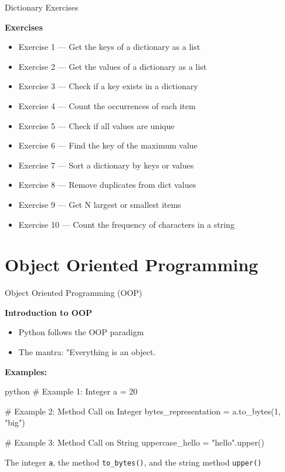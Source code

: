 \documentclass[
	11pt, 
]{beamer}
\begin{document}

\begin{frame}[fragile]{Dictionary Exercises}

\begin{alertblock}{\textbf{Exercises}}
\begin{itemize}
    \item Exercise 1 --- Get the keys of a dictionary as a list
    \item Exercise 2 --- Get the values of a dictionary as a list
    \item Exercise 3 --- Check if a key exists in a dictionary
    \item Exercise 4 --- Count the occurrences of each item
    \item Exercise 5 --- Check if all values are unique
    \item Exercise 6 --- Find the key of the maximum value
    \item Exercise 7 --- Sort a dictionary by keys or values
    \item Exercise 8 --- Remove duplicates from dict values
    \item Exercise 9 --- Get N largest or smallest items
    \item Exercise 10 --- Count the frequency of characters in a string 
\end{itemize}
\end{alertblock}
\end{frame}


\section{Object Oriented Programming}
\begin{frame}[fragile]{Object Oriented Programming (OOP)}

\begin{block}{\textbf{Introduction to OOP}}
    \begin{itemize}
        \item Python follows the OOP paradigm
        \item The mantra: "Everything is an object.
    \end{itemize}
\end{block}

\textbf{Examples:}

\begin{mintedbox}{python}
# Example 1: Integer
a = 20

# Example 2: Method Call on Integer
bytes_representation = a.to_bytes(1, "big")

# Example 3: Method Call on String
uppercase_hello = "hello".upper()
\end{mintedbox}

The integer \texttt{a}, the method \texttt{to\_bytes()}, and the string method \texttt{upper()}


\end{frame}
\end{document}
